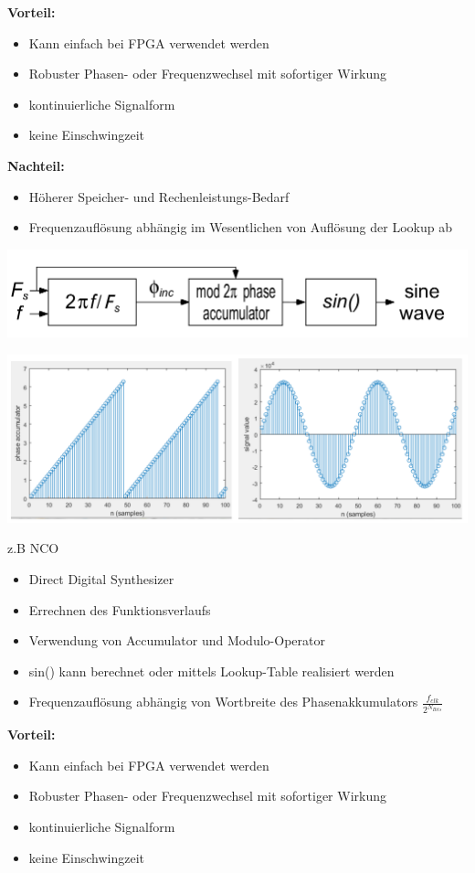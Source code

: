 \documentclass[10pt,a4paper]{article}
\begin{document}
\textbf{Vorteil:}
\begin{itemize}
  \item Kann einfach bei FPGA verwendet werden
  \item Robuster Phasen- oder Frequenzwechsel mit sofortiger Wirkung
  \item kontinuierliche Signalform
  \item keine Einschwingzeit
\end{itemize}  

\textbf{Nachteil:}
\begin{itemize}
  \item Höherer Speicher- und Rechenleistungs-Bedarf
  \item Frequenzauflösung abhängig im Wesentlichen von Auflösung der Lookup ab
\end{itemize}  

\begin{center}
  \includegraphics[width=.5\textwidth]{./img/DDS_sin().png}
\end{center} 

\begin{center}
  \includegraphics[width=.5\textwidth]{./img/sin_phaseincrement.png}
\end{center} 

z.B NCO
\begin{itemize}
  \item Direct Digital Synthesizer
  \item Errechnen des Funktionsverlaufs
  \item Verwendung von Accumulator und Modulo-Operator
  \item sin() kann berechnet oder mittels Lookup-Table realisiert werden
  \item Frequenzauflösung abhängig von Wortbreite des Phasenakkumulators $\frac{f_{clk}}{2^{N_{Bits}}}$
\end{itemize}

\textbf{Vorteil:}
\begin{itemize}
  \item Kann einfach bei FPGA verwendet werden
  \item Robuster Phasen- oder Frequenzwechsel mit sofortiger Wirkung
  \item kontinuierliche Signalform
  \item keine Einschwingzeit
\end{itemize}  
\end{document}
